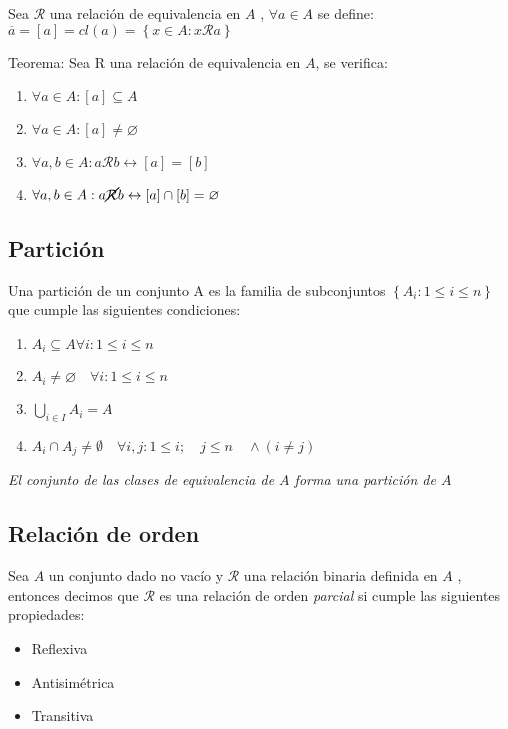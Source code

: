 \documentclass[a4paper, twoside]{article}
\begin{document}
	Sea $\mathcal{R}$ una relación de equivalencia en $A$ , $\forall a \in A $ se define:
	$\overline{a} = \left[a\right] = cl(a) = \left\{x \in A: x\mathcal{R} a\right\}$
	
	Teorema: Sea R una relación de equivalencia en $A$, se verifica:
	\begin{enumerate}
		\item $\forall a \in A: \left[a\right] \subseteq A$
		
		\item $\forall a \in A: \left[a\right] \neq \varnothing$
		
		\item $\forall a,b \in A: a\mathcal{R} b \leftrightarrow \left[a\right] = \left[b\right]$
		
		\item $\forall a,b \in A: a \cancel{\mathcal{R}} b \leftrightarrow \left[a\right] \cap \left[b\right]= \varnothing$
	\end{enumerate}
	
	\subsection{Partición}
	Una partición de un conjunto A es la familia de subconjuntos $\left\{ A_i: 1 \leq i \leq n\right\}$ que cumple las siguientes condiciones:
	\begin{enumerate}
		\item $A_i \subseteq A \forall i: 1 \leq i \leq n$
		
		\item $A_i \neq \varnothing \quad \forall i: 1 \leq i \leq n$
		
		\item $\bigcup_{i\in I} A_i = A$
		
		\item $A_i \cap A_j \neq \emptyset \quad \forall i,j: 1\leq i ; \quad j \leq n	\quad \wedge (i \neq j)$
	\end{enumerate}
	
	\emph{El conjunto de las clases de equivalencia de $A$ forma una partición de $A$}
	
	\subsection{Relación de orden}
	Sea $A$ un conjunto dado no vacío y $\mathcal{R}$ una relación binaria definida en $A$ , entonces decimos que $\mathcal{R}$  es una relación de orden \emph{parcial} si cumple las siguientes propiedades:
	\begin{itemize}
		\item Reflexiva
		\item Antisimétrica
		\item Transitiva
	\end{itemize}
	
\end{document}
